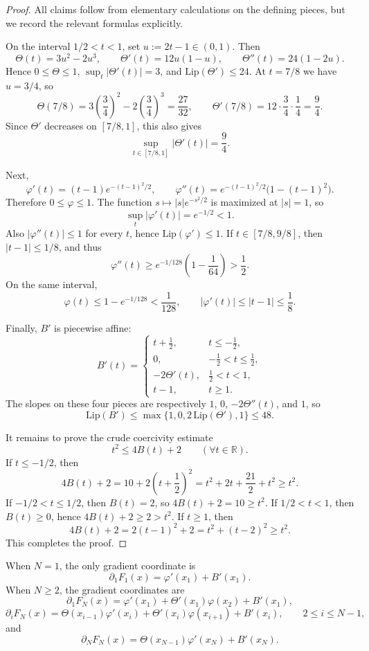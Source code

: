 \documentclass[11pt]{article}
\newcommand{\R}{\mathbb{R}}
\begin{document}
\begin{proof}
All claims follow from elementary calculations on the defining pieces, but we record the relevant formulas explicitly.

On the interval $1/2<t<1$, set $u:=2t-1\in(0,1)$.
Then
\[
\Theta(t)=3u^2-2u^3,
\qquad
\Theta'(t)=12u(1-u),
\qquad
\Theta''(t)=24(1-2u).
\]
Hence $0\le \Theta\le 1$, $\sup_t |\Theta'(t)|=3$, and $\mathrm{Lip}(\Theta')\le 24$.
At $t=7/8$ we have $u=3/4$, so
\[
\Theta(7/8)=3\left(\frac34\right)^2-2\left(\frac34\right)^3=\frac{27}{32},
\qquad
\Theta'(7/8)=12\cdot \frac34\cdot \frac14=\frac94.
\]
Since $\Theta'$ decreases on $[7/8,1]$, this also gives
\[
\sup_{t\in[7/8,1]}|\Theta'(t)|=\frac94.
\]

Next,
\[
\varphi'(t)=(t-1)e^{-(t-1)^2/2},
\qquad
\varphi''(t)=e^{-(t-1)^2/2}\bigl(1-(t-1)^2\bigr).
\]
Therefore $0\le \varphi\le 1$.
The function $s\mapsto |s|e^{-s^2/2}$ is maximized at $|s|=1$, so
\[
\sup_t |\varphi'(t)|=e^{-1/2}<1.
\]
Also $|\varphi''(t)|\le 1$ for every $t$, hence $\mathrm{Lip}(\varphi')\le 1$.
If $t\in[7/8,9/8]$, then $|t-1|\le 1/8$, and thus
\[
\varphi''(t)\ge e^{-1/128}\left(1-\frac{1}{64}\right)>\frac12.
\]
On the same interval,
\[
\varphi(t)\le 1-e^{-1/128}<\frac{1}{128},
\qquad
|\varphi'(t)|\le |t-1|\le \frac18.
\]

Finally, $B'$ is piecewise affine:
\[
B'(t)=
\begin{cases}
t+\frac12, & t\le -\frac12,\\[0.3em]
0, & -\frac12<t\le \frac12,\\[0.3em]
-2\Theta'(t), & \frac12<t<1,\\[0.3em]
t-1, & t\ge 1.
\end{cases}
\]
The slopes on these four pieces are respectively $1$, $0$, $-2\Theta''(t)$, and $1$, so
\[
\mathrm{Lip}(B')\le \max\{1,0,2\,\mathrm{Lip}(\Theta'),1\}\le 48.
\]

It remains to prove the crude coercivity estimate
\[
t^2\le 4B(t)+2
\qquad
(\forall t\in\R).
\]
If $t\le -1/2$, then
\[
4B(t)+2
=
10+2\left(t+\frac12\right)^2
=
t^2+2t+\frac{21}{2}+t^2
\ge t^2.
\]
If $-1/2<t\le 1/2$, then $B(t)=2$, so $4B(t)+2=10\ge t^2$.
If $1/2<t<1$, then $B(t)\ge 0$, hence $4B(t)+2\ge 2>t^2$.
If $t\ge 1$, then
\[
4B(t)+2
=
2(t-1)^2+2
=
t^2+(t-2)^2
\ge t^2.
\]
This completes the proof.
\end{proof}

When \(N=1\), the only gradient coordinate is
\[
\partial_1 F_1(x)=\varphi'(x_1)+B'(x_1).
\]
When \(N\ge2\), the gradient coordinates are
\[
\partial_1 F_N(x)=\varphi'(x_1)+\Theta'(x_1)\varphi(x_2)+B'(x_1),
\]
\[
\partial_i F_N(x)=\Theta(x_{i-1})\varphi'(x_i)+\Theta'(x_i)\varphi(x_{i+1})+B'(x_i),
\qquad
2\le i\le N-1,
\]
and
\[
\partial_N F_N(x)=\Theta(x_{N-1})\varphi'(x_N)+B'(x_N).
\]
\end{document}
